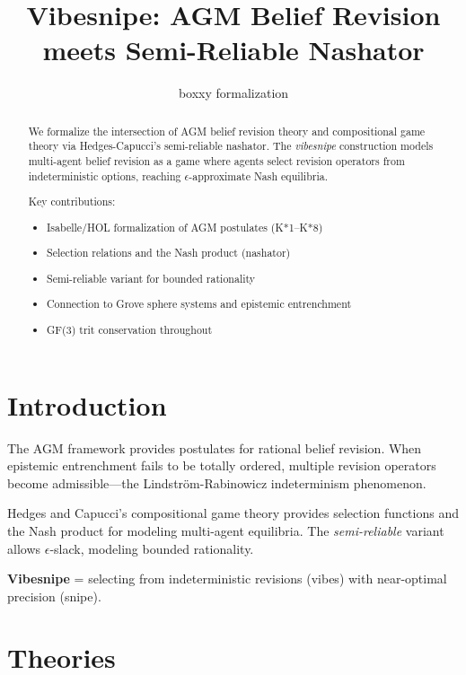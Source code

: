 \documentclass[11pt,a4paper]{article}
\title{Vibesnipe: AGM Belief Revision meets Semi-Reliable Nashator}
\author{boxxy formalization}
\begin{document}
\maketitle

\begin{abstract}
We formalize the intersection of AGM belief revision theory and 
compositional game theory via Hedges-Capucci's semi-reliable nashator.
The \emph{vibesnipe} construction models multi-agent belief revision 
as a game where agents select revision operators from indeterministic 
options, reaching $\epsilon$-approximate Nash equilibria.

Key contributions:
\begin{itemize}
\item Isabelle/HOL formalization of AGM postulates (K*1--K*8)
\item Selection relations and the Nash product (nashator)
\item Semi-reliable variant for bounded rationality
\item Connection to Grove sphere systems and epistemic entrenchment
\item GF(3) trit conservation throughout
\end{itemize}
\end{abstract}

\tableofcontents

\section{Introduction}

The AGM framework \cite{agm1985} provides postulates for rational belief revision.
When epistemic entrenchment fails to be totally ordered, multiple revision 
operators become admissible---the Lindström-Rabinowicz indeterminism phenomenon.

Hedges and Capucci's compositional game theory \cite{hedges2021} provides 
selection functions and the Nash product for modeling multi-agent equilibria.
The \emph{semi-reliable} variant allows $\epsilon$-slack, modeling bounded 
rationality.

\textbf{Vibesnipe} = selecting from indeterministic revisions (vibes) with 
near-optimal precision (snipe).

\section{Theories}


\end{document}
